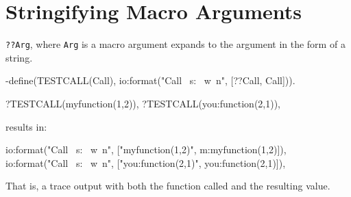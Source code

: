 \section{Stringifying Macro Arguments}
\texttt{??Arg}, where \texttt{Arg} is a macro argument expands to the
argument in the form of a string.

\begin{erlang}
-define(TESTCALL(Call), io:format("Call ~s: ~w~n", [??Call, Call])).

?TESTCALL(myfunction(1,2)),
?TESTCALL(you:function(2,1)),
\end{erlang}

results in:

\begin{erlang}
io:format("Call ~s: ~w~n", ["myfunction(1,2)", m:myfunction(1,2)]),
io:format("Call ~s: ~w~n", ["you:function(2,1)", you:function(2,1)]),
\end{erlang}

That is, a trace output with both the function called and the
resulting value.
